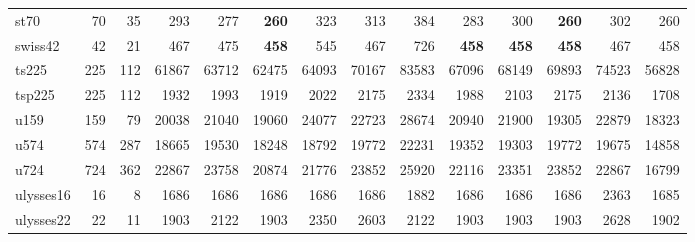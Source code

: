 {\begin{longtable}{l r r r r r r r r r r r r r}
st70 & 70 & 35 & 293 & 277 & \textbf{260} & 323 & 313 & 384 & 283 & 300 & \textbf{260} & 302 & 260 \\
swiss42 & 42 & 21 & 467 & 475 & \textbf{458} & 545 & 467 & 726 & \textbf{458} & \textbf{458} & \textbf{458} & 467 & 458 \\
ts225 & 225 & 112 & 61867 & 63712 & 62475 & 64093 & 70167 & 83583 & 67096 & 68149 & 69893 & 74523 & 56828 \\
tsp225 & 225 & 112 & 1932 & 1993 & 1919 & 2022 & 2175 & 2334 & 1988 & 2103 & 2175 & 2136 & 1708 \\
u159 & 159 & 79 & 20038 & 21040 & 19060 & 24077 & 22723 & 28674 & 20940 & 21900 & 19305 & 22879 & 18323 \\
u574 & 574 & 287 & 18665 & 19530 & 18248 & 18792 & 19772 & 22231 & 19352 & 19303 & 19772 & 19675 & 14858 \\
u724 & 724 & 362 & 22867 & 23758 & 20874 & 21776 & 23852 & 25920 & 22116 & 23351 & 23852 & 22867 & 16799 \\
ulysses16 & 16 & 8 & 1686 & 1686 & 1686 & 1686 & 1686 & 1882 & 1686 & 1686 & 1686 & 2363 & 1685 \\
ulysses22 & 22 & 11 & 1903 & 2122 & 1903 & 2350 & 2603 & 2122 & 1903 & 1903 & 1903 & 2628 & 1902 \\
\end{longtable}}